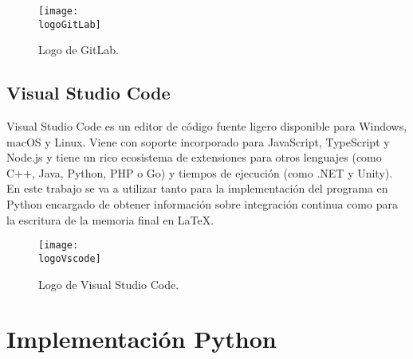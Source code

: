 \begin{figure}[h]
    \centering
    \texttt{[image: \\logoGitLab]}
    \caption{Logo de GitLab.}
\end{figure}

\subsection{Visual Studio Code}
Visual Studio Code es un editor de código fuente ligero disponible para Windows, macOS y Linux. Viene con soporte incorporado para JavaScript, TypeScript y Node.js y tiene un rico ecosistema de extensiones para otros lenguajes  (como C++, Java, Python, PHP o Go) y tiempos de ejecución (como .NET y Unity).
En este trabajo se va a utilizar tanto para la implementación del programa en Python encargado de obtener información sobre integración continua como para la escritura de la memoria final en LaTeX.

\begin{figure}[h]
    \centering
    \texttt{[image: \\logoVscode]}
    \caption{Logo de Visual Studio Code.}
\end{figure}

\section{Implementación Python}


